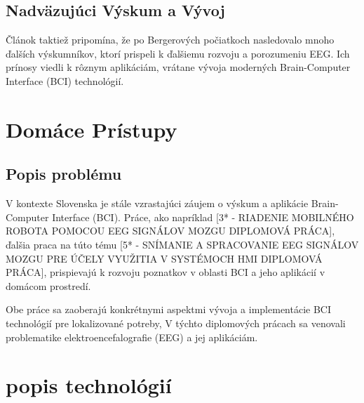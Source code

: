 \subsection{Nadväzujúci Výskum a Vývoj}
\tab[5 mm] Článok taktiež pripomína, že po Bergerových počiatkoch nasledovalo mnoho ďalších výskumníkov, ktorí prispeli k ďalšiemu rozvoju a porozumeniu EEG. Ich prínosy viedli k rôznym aplikáciám, vrátane vývoja moderných Brain-Computer Interface (BCI) technológií.

\section{Domáce Prístupy}
\subsection{Popis problému}
\tab[5 mm] V kontexte Slovenska je stále vzrastajúci záujem o výskum a aplikácie Brain-Computer Interface (BCI). Práce, ako napríklad [3* - RIADENIE MOBILNÉHO ROBOTA POMOCOU EEG SIGNÁLOV MOZGU DIPLOMOVÁ PRÁCA], ďalšia praca na túto tému [5* - SNÍMANIE A SPRACOVANIE EEG SIGNÁLOV MOZGU PRE ÚČELY VYUŽITIA V SYSTÉMOCH HMI DIPLOMOVÁ PRÁCA], prispievajú k rozvoju poznatkov v oblasti BCI a jeho aplikácií v domácom prostredí.
 
\tab[5 mm] Obe práce sa zaoberajú konkrétnymi aspektmi vývoja a implementácie BCI technológií pre lokalizované potreby, V týchto diplomových prácach sa venovali problematike elektroencefalografie (EEG) a jej aplikáciám.

\section{popis technológií}
